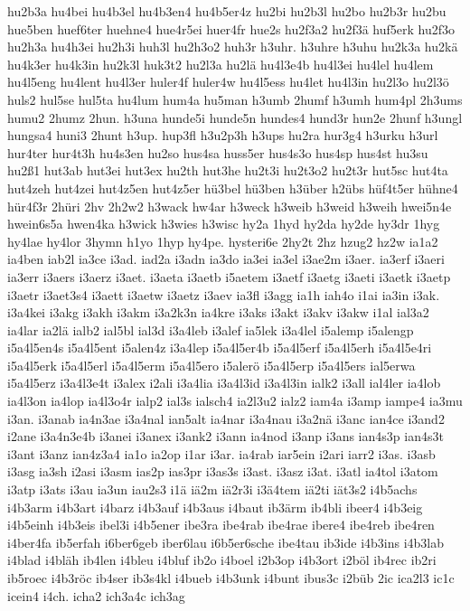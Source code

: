 {hu2b3a
hu4bei
hu4b3el
hu4b3en4
hu4b5er4z
hu2bi
hu2b3l
hu2bo
hu2b3r
hu2bu
hue5ben
huef6ter
huehne4
hue4r5ei
huer4fr
hue2s
hu2f3a2
hu2f3ä
huf5erk
hu2f3o
hu2h3a
hu4h3ei
hu2h3i
huh3l
hu2h3o2
huh3r
h3uhr.
h3uhre
h3uhu
hu2k3a
hu2kä
hu4k3er
hu4k3in
hu2k3l
huk3t2
hu2l3a
hu2lä
hu4l3e4b
hu4l3ei
hu4lel
hu4lem
hu4l5eng
hu4lent
hu4l3er
huler4f
huler4w
hu4l5ess
hu4let
hu4l3in
hu2l3o
hu2l3ö
huls2
hul5se
hul5ta
hu4lum
hum4a
hu5man
h3umb
2humf
h3umh
hum4pl
2h3ums
humu2
2humz
2hun.
h3una
hunde5i
hunde5n
hundes4
hund3r
hun2e
2hunf
h3ungl
hungsa4
huni3
2hunt
h3up.
hup3fl
h3u2p3h
h3ups
hu2ra
hur3g4
h3urku
h3url
hur4ter
hur4t3h
hu4s3en
hu2so
hus4sa
huss5er
hus4s3o
hus4sp
hus4st
hu3su
hu2ß1
hut3ab
hut3ei
hut3ex
hu2th
hut3he
hu2t3i
hu2t3o2
hu2t3r
hut5sc
hut4ta
hut4zeh
hut4zei
hut4z5en
hut4z5er
hü3bel
hü3ben
h3über
h2übs
hüf4t5er
hühne4
hür4f3r
2hüri
2hv
2h2w2
h3wack
hw4ar
h3weck
h3weib
h3weid
h3weih
hwei5n4e
hwein6s5a
hwen4ka
h3wick
h3wies
h3wisc
hy2a
1hyd
hy2da
hy2de
hy3dr
1hyg
hy4lae
hy4lor
3hymn
h1yo
1hyp
hy4pe.
hysteri6e
2hy2t
2hz
hzug2
hz2w
ia1a2
ia4ben
iab2l
ia3ce
i3ad.
iad2a
i3adn
ia3do
ia3ei
ia3el
i3ae2m
i3aer.
ia3erf
i3aeri
ia3err
i3aers
i3aerz
i3aet.
i3aeta
i3aetb
i5aetem
i3aetf
i3aetg
i3aeti
i3aetk
i3aetp
i3aetr
i3aet3s4
i3aett
i3aetw
i3aetz
i3aev
ia3fl
i3agg
ia1h
iah4o
i1ai
ia3in
i3ak.
i3a4kei
i3akg
i3akh
i3akm
i3a2k3n
ia4kre
i3aks
i3akt
i3akv
i3akw
i1al
ial3a2
ia4lar
ia2lä
ialb2
ial5bl
ial3d
i3a4leb
i3alef
ia5lek
i3a4lel
i5alemp
i5alengp
i5a4l5en4s
i5a4l5ent
i5alen4z
i3a4lep
i5a4l5er4b
i5a4l5erf
i5a4l5erh
i5a4l5e4ri
i5a4l5erk
i5a4l5erl
i5a4l5erm
i5a4l5ero
i5alerö
i5a4l5erp
i5a4l5ers
ial5erwa
i5a4l5erz
i3a4l3e4t
i3alex
i2ali
i3a4lia
i3a4l3id
i3a4l3in
ialk2
i3all
ial4ler
ia4lob
ia4l3on
ia4lop
ia4l3o4r
ialp2
ial3s
ialsch4
ia2l3u2
ialz2
iam4a
i3amp
iampe4
ia3mu
i3an.
i3anab
ia4n3ae
i3a4nal
ian5alt
ia4nar
i3a4nau
i3a2nä
i3anc
ian4ce
i3and2
i2ane
i3a4n3e4b
i3anei
i3anex
i3ank2
i3ann
ia4nod
i3anp
i3ans
ian4s3p
ian4s3t
i3ant
i3anz
ian4z3a4
ia1o
ia2op
i1ar
i3ar.
ia4rab
iar5ein
i2ari
iarr2
i3as.
i3asb
i3asg
ia3sh
i2asi
i3asm
ias2p
ias3pr
i3as3s
i3ast.
i3asz
i3at.
i3atl
ia4tol
i3atom
i3atp
i3ats
i3au
ia3un
iau2s3
i1ä
iä2m
iä2r3i
i3ä4tem
iä2ti
iät3s2
i4b5achs
i4b3arm
i4b3art
i4barz
i4b3auf
i4b3aus
i4baut
ib3ärm
ib4bli
ibeer4
i4b3eig
i4b5einh
i4b3eis
ibel3i
i4b5ener
ibe3ra
ibe4rab
ibe4rae
ibere4
ibe4reb
ibe4ren
i4ber4fa
ib5erfah
i6ber6geb
iber6lau
i6b5er6sche
ibe4tau
ib3ide
i4b3ins
i4b3lab
i4blad
i4bläh
ib4len
i4bleu
i4bluf
ib2o
i4boel
i2b3op
i4b3ort
i2böl
ib4rec
ib2ri
ib5roec
i4b3röc
ib4ser
ib3s4kl
i4bueb
i4b3unk
i4bunt
ibus3c
i2büb
2ic
ica2l3
ic1c
icein4
i4ch.
icha2
ich3a4c
ich3ag
}
